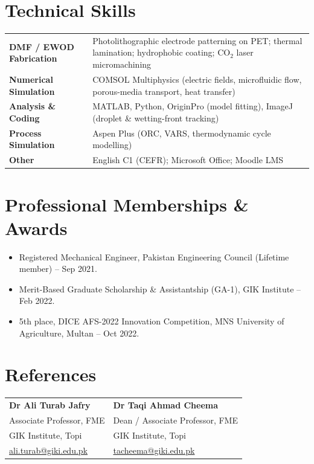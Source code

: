 \documentclass[11pt,a4paper]{article}
\begin{document}
\section{Technical Skills}

\begin{tabularx}{\textwidth}{@{}>{\bfseries}lX@{}}
DMF / EWOD Fabrication
  & Photolithographic electrode patterning on PET; thermal lamination;
    hydrophobic coating; CO$_2$ laser micromachining \\[3pt]
Numerical Simulation
  & COMSOL Multiphysics (electric fields, microfluidic flow, porous-media
    transport, heat transfer) \\[3pt]
Analysis \& Coding
  & MATLAB, Python, OriginPro (model fitting), ImageJ (droplet \&
    wetting-front tracking) \\[3pt]
Process Simulation
  & Aspen Plus (ORC, VARS, thermodynamic cycle modelling) \\[3pt]
Other
  & English C1 (CEFR); Microsoft Office; Moodle LMS \\
\end{tabularx}

\section{Professional Memberships \& Awards}
\begin{itemize}
  \item Registered Mechanical Engineer, Pakistan Engineering Council
        (Lifetime member) -- Sep 2021.
  \item Merit-Based Graduate Scholarship \& Assistantship (GA-1), GIK Institute
        -- Feb 2022.
  \item 5th place, DICE AFS-2022 Innovation Competition, MNS University of
        Agriculture, Multan -- Oct 2022.
\end{itemize}

\section{References}

\begin{tabularx}{\textwidth}{@{}XX@{}}
\textbf{Dr Ali Turab Jafry}       & \textbf{Dr Taqi Ahmad Cheema} \\
Associate Professor, FME          & Dean / Associate Professor, FME \\
GIK Institute, Topi               & GIK Institute, Topi \\
\href{mailto:ali.turab@giki.edu.pk}{ali.turab@giki.edu.pk}
  & \href{mailto:tacheema@giki.edu.pk}{tacheema@giki.edu.pk} \\
\end{tabularx}
\end{document}
